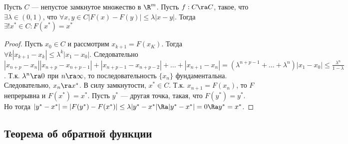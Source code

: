 \begin{theorem}[Банах]
    Пусть \(C\) --- непустое замкнутое множество в \(\R^m\). Пусть \(f: C \ra C\), такое, что \(\exists \lambda \in (0, 1)\), что \(\forall x, y \in C |F(x) - F(y)| \le \lambda|x - y|\). Тогда \(\exists! x^* \in C: F(x^*) = x^*\)
\end{theorem}
\begin{proof}
    Пусть \(x_0 \in C\) и рассмотрим \(x_{k + 1} = F(x_K)\). Тогда \(\forall k |x_{k + 1} - x_k| \le \lambda^k |x_1 - x_0|\). Следовательно \(|x_{n + p} - x_n| |x_{n + p} - x_{n + p - 1}| + |x_{n + p - 1} - x_{n + p - 2}| + \dots + |x_{n + 1} - x_n| = \left(\lambda^{n + p - 1} + \dots + \lambda^n\right)|x_1 - x_0| \le \frac{\lambda^n}{1 - \lambda}\). Т.к. \(\lambda^n \ra 0\) при \(n \ra \infty\), то последовательность \(\{x_n\}\) фундаментальна. Следовательно, \(x_n \ra x^*\). В силу замкнутости, \(x^* \in C\). Т.к. \(x_{n + 1} = F(x_n)\), то \(F\) непрерывна и \(F(x^*) = x^*\). Пусть \(y^*\) --- другая точка, такая, что \(F(y^*) = y^*\). Но тогда \(|y^* - x^*| = |F(y^*) - F(x^*)| \le \lambda |y^* - x^*| \Ra |y^* - x^*| = 0 \Ra y^* = x^*\).
\end{proof}

\subsection{Теорема об обратной функции}

